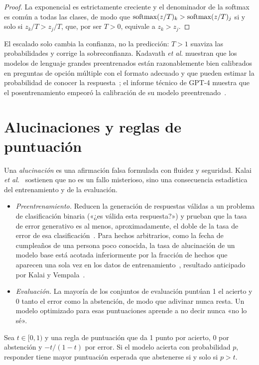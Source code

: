 \begin{proof}
La exponencial es estrictamente creciente y el denominador de la softmax es común a todas las clases, de modo que $\operatorname{softmax}(z/T)_k>\operatorname{softmax}(z/T)_j$ si y solo si $z_k/T>z_j/T$, que, por ser $T>0$, equivale a $z_k>z_j$.
\end{proof}

El escalado solo cambia la confianza, no la predicción: $T>1$ suaviza las probabilidades y corrige la sobreconfianza. Kadavath \emph{et al.} muestran que los modelos de lenguaje grandes preentrenados están razonablemente bien calibrados en preguntas de opción múltiple con el formato adecuado y que pueden estimar la probabilidad de conocer la respuesta~\cite{kadavath}; el informe técnico de GPT-4 muestra que el posentrenamiento empeoró la calibración de su modelo preentrenado~\cite{gpt4}.

\section{Alucinaciones y reglas de puntuación}

Una \emph{alucinación} es una afirmación falsa formulada con fluidez y seguridad. Kalai \emph{et al.}~\cite{kalai25} sostienen que no es un fallo misterioso, sino una consecuencia estadística del entrenamiento y de la evaluación.
\begin{itemize}[leftmargin=1.4em]
  \item \emph{Preentrenamiento.} Reducen la generación de respuestas válidas a un problema de clasificación binaria («¿es válida esta respuesta?») y prueban que la tasa de error generativo es al menos, aproximadamente, el doble de la tasa de error de esa clasificación~\cite[§3.1, corolario~1]{kalai25}. Para hechos arbitrarios, como la fecha de cumpleaños de una persona poco conocida, la tasa de alucinación de un modelo base está acotada inferiormente por la fracción de hechos que aparecen una sola vez en los datos de entrenamiento~\cite[§3.3.1, teorema~2]{kalai25}, resultado anticipado por Kalai y Vempala~\cite{kalai-vempala}.
  \item \emph{Evaluación.} La mayoría de los conjuntos de evaluación puntúan 1 el acierto y 0 tanto el error como la abstención, de modo que adivinar nunca resta. Un modelo optimizado para esas puntuaciones aprende a no decir nunca «no lo sé».
\end{itemize}

\begin{proposicion}\label{prop:umbral-t}
Sea $t\in[0,1)$ y una regla de puntuación que da 1 punto por acierto, 0 por abstención y $-t/(1-t)$ por error. Si el modelo acierta con probabilidad $p$, responder tiene mayor puntuación esperada que abstenerse si y solo si $p>t$.
\end{proposicion}

